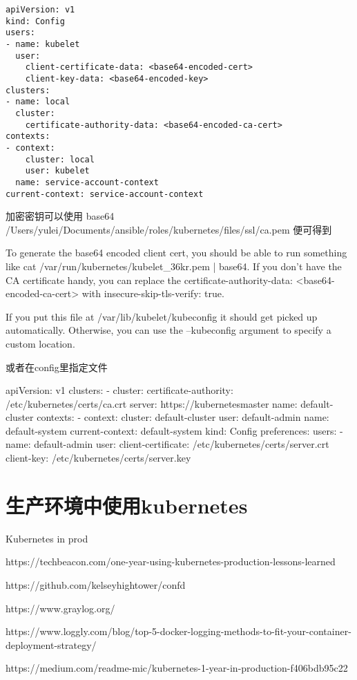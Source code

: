 \begin{lstlisting}
apiVersion: v1
kind: Config
users:
- name: kubelet
  user:
    client-certificate-data: <base64-encoded-cert>
    client-key-data: <base64-encoded-key>
clusters:
- name: local
  cluster:
    certificate-authority-data: <base64-encoded-ca-cert>
contexts:
- context:
    cluster: local
    user: kubelet
  name: service-account-context
current-context: service-account-context

\end{lstlisting}

加密密钥可以使用 base64 /Users/yulei/Documents/ansible/roles/kubernetes/files/ssl/ca.pem 便可得到

To generate the base64 encoded client cert, you should be able to run something like cat /var/run/kubernetes/kubelet_36kr.pem | base64. If you don't have the CA certificate handy, you can replace the certificate-authority-data: <base64-encoded-ca-cert> with insecure-skip-tls-verify: true.

If you put this file at /var/lib/kubelet/kubeconfig it should get picked up automatically. Otherwise, you can use the --kubeconfig argument to specify a custom location.

或者在config里指定文件

apiVersion: v1
clusters:
- cluster:
    certificate-authority: /etc/kubernetes/certs/ca.crt
    server: https://kubernetesmaster
  name: default-cluster
contexts:
- context:
    cluster: default-cluster
    user: default-admin
  name: default-system
current-context: default-system
kind: Config
preferences: {}
users:
- name: default-admin
  user:
    client-certificate: /etc/kubernetes/certs/server.crt
    client-key: /etc/kubernetes/certs/server.key


\section{生产环境中使用kubernetes}

Kubernetes in prod

https://techbeacon.com/one-year-using-kubernetes-production-lessons-learned

https://github.com/kelseyhightower/confd

https://www.graylog.org/

https://www.loggly.com/blog/top-5-docker-logging-methods-to-fit-your-container-deployment-strategy/

https://medium.com/readme-mic/kubernetes-1-year-in-production-f406bdb95c22

